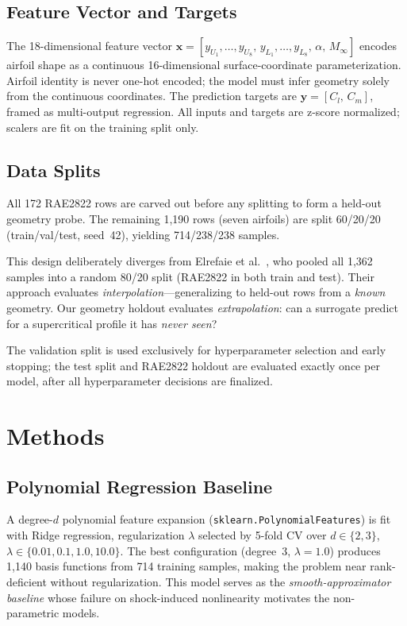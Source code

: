 \documentclass[11pt]{article}
\begin{document}
\subsection{Feature Vector and Targets}

The 18-dimensional feature vector
$\mathbf{x} = [y_{U_1},\ldots,y_{U_8},\,y_{L_1},\ldots,y_{L_8},\,\alpha,\,M_\infty]$
encodes airfoil shape as a continuous 16-dimensional surface-coordinate
parameterization. Airfoil identity is never one-hot encoded; the model must
infer geometry solely from the continuous coordinates. The prediction targets
are $\mathbf{y} = [C_l,\, C_m]$, framed as multi-output regression. All inputs
and targets are z-score normalized; scalers are fit on the training split only.

\subsection{Data Splits}

All 172 RAE2822 rows are carved out before any splitting to form a
held-out geometry probe. The remaining 1,190 rows (seven airfoils) are
split 60/20/20 (train/val/test, seed~42), yielding 714/238/238 samples.

This design deliberately diverges from Elrefaie et al.\ \cite{elrefaie2024},
who pooled all 1,362 samples into a random 80/20 split (RAE2822 in both train
and test). Their approach evaluates \emph{interpolation}---generalizing to
held-out rows from a \emph{known} geometry. Our geometry holdout evaluates
\emph{extrapolation}: can a surrogate predict for a supercritical profile it
has \emph{never seen}?

The validation split is used exclusively for hyperparameter selection and early
stopping; the test split and RAE2822 holdout are evaluated exactly once per
model, after all hyperparameter decisions are finalized.

\section{Methods}

\subsection{Polynomial Regression Baseline}

A degree-$d$ polynomial feature expansion
(\texttt{sklearn.PolynomialFeatures}) is fit with Ridge regression,
regularization $\lambda$ selected by 5-fold CV over
$d \in \{2,3\}$, $\lambda \in \{0.01, 0.1, 1.0, 10.0\}$. The best
configuration (degree~3, $\lambda=1.0$) produces 1,140 basis functions
from 714 training samples, making the problem near rank-deficient without
regularization. This model serves as the \emph{smooth-approximator baseline}
whose failure on shock-induced nonlinearity motivates the non-parametric models.
\end{document}
